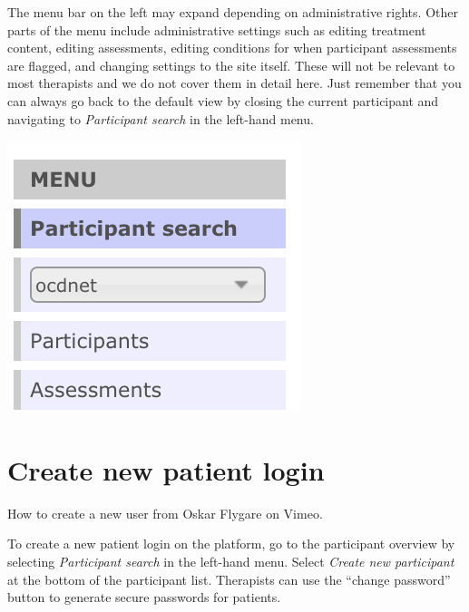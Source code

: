 \documentclass[]{book}
\begin{document}
The menu bar on the left may expand depending on administrative rights. Other parts of the menu include administrative settings such as editing treatment content, editing assessments, editing conditions for when participant assessments are flagged, and changing settings to the site itself. These will not be relevant to most therapists and we do not cover them in detail here. Just remember that you can always go back to the default view by closing the current participant and navigating to \emph{Participant search} in the left-hand menu.

\includegraphics{images/therapist-menu.png}

\hypertarget{create-new-patient-login}{%
\section{Create new patient login}\label{create-new-patient-login}}

How to create a new user from Oskar Flygare on Vimeo.

To create a new patient login on the platform, go to the participant overview by selecting \emph{Participant search} in the left-hand menu. Select \emph{Create new participant} at the bottom of the participant list. Therapists can use the ``change password'' button to generate secure passwords for patients.
\end{document}
